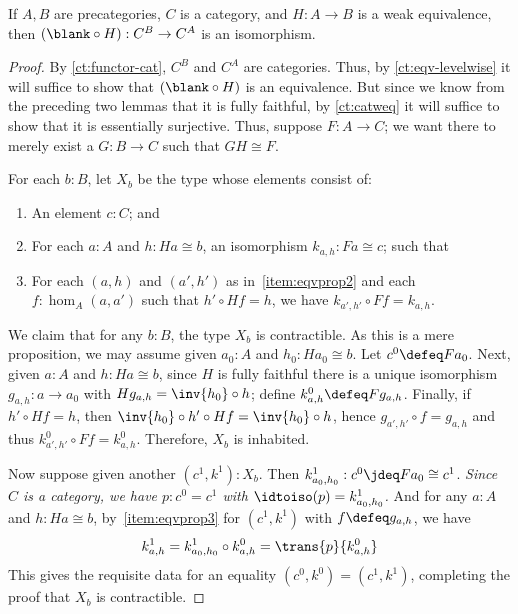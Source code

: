 %
\begin{thm}\label{ct:cat-weq-eq}
  If $A,B$ are precategories, $C$ is a category, and $H:A\to B$ is a weak equivalence, then $(\blank\circ H):C^B \to C^A$ is an isomorphism.
\end{thm}

\begin{proof}
  By \cref{ct:functor-cat}, $C^B$ and $C^A$ are categories.
  Thus, by \cref{ct:eqv-levelwise} it will suffice to show that $(\blank\circ H)$ is an equivalence.
  But since we know from the preceding two lemmas that it is fully faithful, by \cref{ct:catweq} it will suffice to show that it is essentially surjective.
  Thus, suppose $F:A\to C$; we want there to merely exist a $G:B\to C$ such that $GH\cong F$.

  For each $b:B$, let $X_b$ be the type whose elements consist of:
  \begin{enumerate}
  \item An element $c:C$; and
  \item For each $a:A$ and $h:Ha\cong b$, an isomorphism $k_{a,h}:Fa\cong c$; such that\label{item:eqvprop2}
  \item For each $(a,h)$ and $(a',h')$ as in~\ref{item:eqvprop2} and each $f:\hom_A(a,a')$ such that $h'\circ Hf = h$, we have $k_{a',h'}\circ Ff = k_{a,h}$.\label{item:eqvprop3}
  \end{enumerate}
  We claim that for any $b:B$, the type $X_b$ is contractible.
  As this is a mere proposition, we may assume given $a_0:A$ and $h_0:Ha_0 \cong b$.
  Let $c^0\defeq Fa_0$.
  Next, given $a:A$ and $h:Ha\cong b$, since $H$ is fully faithful there is a unique isomorphism $g_{a,h}:a\to a_0$ with $Hg_{a,h} = \inv{h_0}\circ h$; define $k^0_{a,h} \defeq Fg_{a,h}$.
  Finally, if $h'\circ Hf = h$, then $\inv{h_0}\circ h'\circ Hf = \inv{h_0}\circ h$, hence $g_{a',h'} \circ f = g_{a,h}$ and thus $k^0_{a',h'}\circ Ff = k^0_{a,h}$.
  Therefore, $X_b$ is inhabited.

  Now suppose given another $(c^1,k^1): X_b$.
  Then $k^1_{a_0,h_0}:c^0 \jdeq Fa_0 \cong c^1$.
  \emph{Since $C$ is a category, we have $p:c^0=c^1$ with $\idtoiso(p) = k^1_{a_0,h_0}$.}
  And for any $a:A$ and $h:Ha\cong b$, by~\ref{item:eqvprop3} for $(c^1,k^1)$ with $f\defeq g_{a,h}$, we have
  \[k^1_{a,h} = k^1_{a_0,h_0} \circ k^0_{a,h} = \trans{p}{k^0_{a,h}}\]
  This gives the requisite data for an equality $(c^0,k^0)=(c^1,k^1)$, completing the proof that $X_b$ is contractible.


\end{proof}
